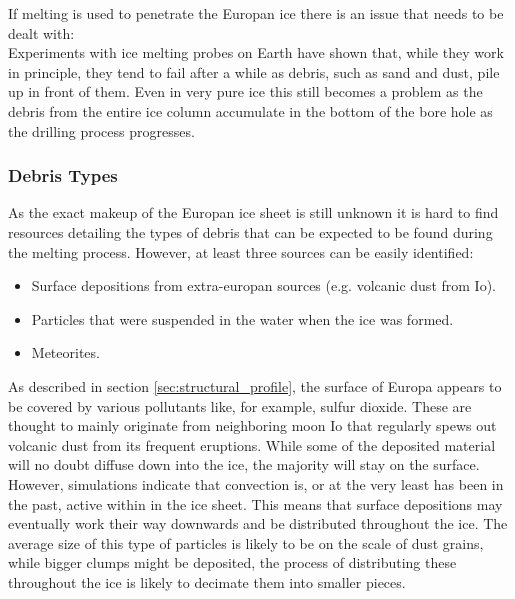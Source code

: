 If melting is used to penetrate the Europan ice there is an issue that needs to be dealt with:\\ Experiments with ice melting probes on Earth have shown that, while they work in principle, they tend to fail after a while as debris, such as sand and dust, pile up in front of them\cite{article:di1998a}. Even in very pure ice this still becomes a problem as the debris from the entire ice column accumulate in the bottom of the bore hole as the drilling process progresses. 

\subsubsection{Debris Types}
As the exact makeup of the Europan ice sheet is still unknown it is hard to find resources detailing the types of debris that can be expected to be found during the melting process. However, at least three sources can be easily identified:\\

\begin{itemize}
	\item Surface depositions from extra-europan sources (e.g. volcanic dust from Io).
	\item Particles that were suspended in the water when the ice was formed.
	\item Meteorites.
\end{itemize}

\noindent
As described in section \ref{sec:structural_profile}, the surface of Europa appears to be covered by various pollutants like, for example, sulfur dioxide. These are thought to mainly originate from neighboring moon Io that regularly spews out volcanic dust from its frequent eruptions. While some of the deposited material will no doubt diffuse down into the ice, the majority will stay on the surface. However, simulations indicate that convection is, or at the very least has been in the past, active within in the ice sheet\cite{article:barr2014a}. This means that surface depositions may eventually work their way downwards and be distributed throughout the ice. The average size of this type of particles is likely to be on the scale of dust grains, while bigger clumps might be deposited, the process of distributing these throughout the ice is likely to decimate them into smaller pieces. \\

